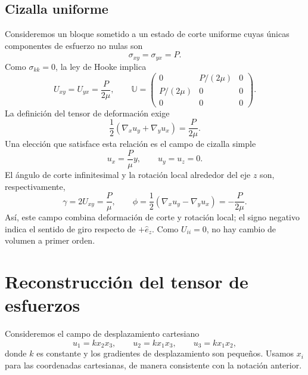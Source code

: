 \subsection{Cizalla uniforme}

Consideremos un bloque sometido a un estado de corte uniforme cuyas únicas componentes de esfuerzo no nulas son
\[
\sigma_{xy}=\sigma_{yx}=P.
\]
Como $\sigma_{kk}=0$, la ley de Hooke implica
\[
U_{xy}=U_{yx}=\frac{P}{2\mu},
\qquad
\mathbb U=\begin{pmatrix}
0&P/(2\mu)&0\\
P/(2\mu)&0&0\\
0&0&0
\end{pmatrix}.
\]
La definición del tensor de deformación exige
\[
\frac{1}{2}(\nabla_x u_y+\nabla_y u_x)=\frac{P}{2\mu}.
\]
Una elección que satisface esta relación es el campo de cizalla simple
\[
u_x=\frac{P}{\mu}y,
\qquad u_y=u_z=0.
\]
El ángulo de corte infinitesimal y la rotación local alrededor del eje $z$ son, respectivamente,
\[
\gamma=2U_{xy}=\frac{P}{\mu},
\qquad
\phi=\frac{1}{2}(\nabla_x u_y-\nabla_y u_x)
=-\frac{P}{2\mu}.
\]
Así, este campo combina deformación de corte y rotación local; el signo negativo indica el sentido de giro respecto de $+\hat e_z$. Como $U_{ii}=0$, no hay cambio de volumen a primer orden.

\section{Reconstrucción del tensor de esfuerzos}

Consideremos el campo de desplazamiento cartesiano
\[
u_1=kx_2x_3,
\qquad u_2=kx_1x_3,
\qquad u_3=kx_1x_2,
\]
donde $k$ es constante y los gradientes de desplazamiento son pequeños. Usamos $x_i$ para las coordenadas cartesianas, de manera consistente con la notación anterior.

